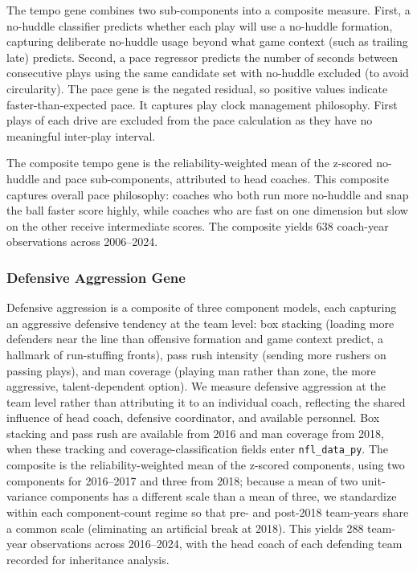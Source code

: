 \documentclass[USenglish]{article}
\theoremstyle{dgthm}
\theoremstyle{dgdef}
\begin{document}
The tempo gene combines two sub-components into a composite measure. First, a no-huddle classifier predicts whether each play will use a no-huddle formation, capturing deliberate no-huddle usage beyond what game context (such as trailing late) predicts. Second, a pace regressor predicts the number of seconds between consecutive plays using the same candidate set with no-huddle excluded (to avoid circularity). The pace gene is the negated residual, so positive values indicate faster-than-expected pace. It captures play clock management philosophy. First plays of each drive are excluded from the pace calculation as they have no meaningful inter-play interval.

The composite tempo gene is the reliability-weighted mean of the z-scored no-huddle and pace sub-components, attributed to head coaches. This composite captures overall pace philosophy: coaches who both run more no-huddle and snap the ball faster score highly, while coaches who are fast on one dimension but slow on the other receive intermediate scores. The composite yields 638 coach-year observations across 2006--2024.

\subsubsection{Defensive Aggression Gene}

Defensive aggression is a composite of three component models, each capturing an aggressive defensive tendency at the team level: box stacking (loading more defenders near the line than offensive formation and game context predict, a hallmark of run-stuffing fronts), pass rush intensity (sending more rushers on passing plays), and man coverage (playing man rather than zone, the more aggressive, talent-dependent option). We measure defensive aggression at the team level rather than attributing it to an individual coach, reflecting the shared influence of head coach, defensive coordinator, and available personnel. Box stacking and pass rush are available from 2016 and man coverage from 2018, when these tracking and coverage-classification fields enter \texttt{nfl\_data\_py}. The composite is the reliability-weighted mean of the z-scored components, using two components for 2016--2017 and three from 2018; because a mean of two unit-variance components has a different scale than a mean of three, we standardize within each component-count regime so that pre- and post-2018 team-years share a common scale (eliminating an artificial break at 2018). This yields 288 team-year observations across 2016--2024, with the head coach of each defending team recorded for inheritance analysis.
\end{document}
